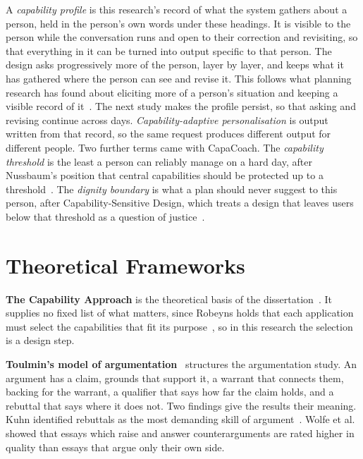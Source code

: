 \documentclass[manuscript,screen,review]{acmart}
\begin{document}
A \textit{capability profile} is this research's record of what the system gathers about a person, held in the person's own words under these headings. It is visible to the person while the conversation runs and open to their correction and revisiting, so that everything in it can be turned into output specific to that person. The design asks progressively more of the person, layer by layer, and keeps what it has gathered where the person can see and revise it. This follows what planning research has found about eliciting more of a person's situation and keeping a visible record of it~\cite{shin2025planfitting,xu2025goals,xu2022understanding,xu2024understanding}. The next study makes the profile persist, so that asking and revising continue across days. \textit{Capability-adaptive personalisation} is output written from that record, so the same request produces different output for different people. Two further terms came with CapaCoach. The \textit{capability threshold} is the least a person can reliably manage on a hard day, after Nussbaum's position that central capabilities should be protected up to a threshold~\cite{nussbaum2011creating}. The \textit{dignity boundary} is what a plan should never suggest to this person, after Capability-Sensitive Design, which treats a design that leaves users below that threshold as a question of justice~\cite{jacobs2020capability}.

\section{Theoretical Frameworks}

\textbf{The Capability Approach} is the theoretical basis of the dissertation~\cite{sen1999development,robeyns2005capability,robeyns2017wellbeing}. It supplies no fixed list of what matters, since Robeyns holds that each application must select the capabilities that fit its purpose~\cite{robeyns2017wellbeing}, so in this research the selection is a design step.

\textbf{Toulmin's model of argumentation}~\cite{toulmin2003uses} structures the argumentation study. An argument has a claim, grounds that support it, a warrant that connects them, backing for the warrant, a qualifier that says how far the claim holds, and a rebuttal that says where it does not. Two findings give the results their meaning. Kuhn identified rebuttals as the most demanding skill of argument~\cite{kuhn1991skills}. Wolfe et al.~\cite{wolfe2009argumentation} showed that essays which raise and answer counterarguments are rated higher in quality than essays that argue only their own side.
\end{document}
